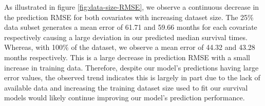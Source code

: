 \documentclass{l4proj}
\begin{document}
As illustrated in figure \ref{fig:data-size-RMSE}, we observe a continuous decrease in the prediction RMSE for both covariates with increasing dataset size. The 25\% data subset  generates a mean error of 61.71 and 59.66 months for each covariate respectively causing a large deviation in our predicted median survival times. Whereas, with 100\% of the dataset, we observe a mean error of 44.32 and 43.28 months respectively. This is a large decrease in prediction RMSE with a small increase in training data. Therefore, despite our model's predictions having large error values, the observed trend indicates this is largely in part due to the lack of available data and increasing the training dataset size used to fit our survival models would likely continue improving our model's prediction performance. 





\end{document}
